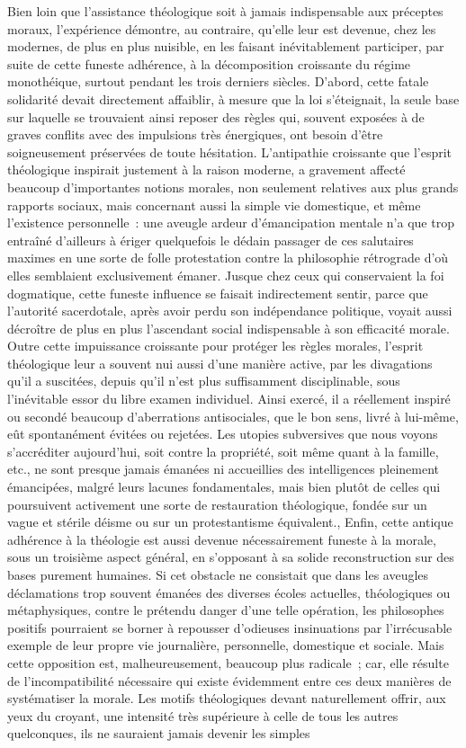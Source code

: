 \documentclass[french,twoside]{book} %
\begin{document}
Bien loin que l’assistance théologique soit à jamais indispensable aux préceptes moraux, l’expérience démontre, au contraire, qu’elle leur est devenue, chez les modernes, de plus en plus nuisible, en les faisant inévitablement participer, par suite de cette funeste adhérence, à la décomposition croissante du régime monothéique, surtout pendant les trois derniers siècles. D’abord, cette fatale solidarité devait directement affaiblir, à mesure que la loi s’éteignait, la seule base sur laquelle se trouvaient ainsi reposer des règles qui, souvent exposées à de graves conflits avec des impulsions très énergiques, ont besoin d’être soigneusement préservées de toute hésitation. L’antipathie croissante que l’esprit théologique inspirait justement à la raison moderne, a gravement affecté beaucoup d’importantes notions morales, non seulement relatives aux plus grands rapports sociaux, mais concernant aussi la simple vie domestique, et même l’existence personnelle : une aveugle ardeur d’émancipation mentale n’a que trop entraîné d’ailleurs à ériger quelquefois le dédain passager de ces salutaires maximes en une sorte de folle protestation contre la philosophie rétrograde d’où elles semblaient exclusivement émaner. Jusque chez ceux qui conservaient la foi dogmatique, cette funeste influence se faisait indirectement sentir, parce que l’autorité sacerdotale, après avoir perdu son indépendance politique, voyait aussi décroître de plus en plus l’ascendant social indispensable à son efficacité morale. Outre cette impuissance croissante pour protéger les règles morales, l’esprit théologique leur a souvent nui aussi d’une manière active, par les divagations qu’il a suscitées, depuis qu’il n’est plus suffisamment disciplinable, sous l’inévitable essor du libre examen individuel. Ainsi exercé, il a réellement inspiré ou secondé beaucoup d’aberrations antisociales, que le bon sens, livré à lui-même, eût spontanément évitées ou rejetées. Les utopies subversives que nous voyons s’accréditer aujourd’hui, soit contre la propriété, soit même quant à la famille, etc., ne sont presque jamais émanées ni accueillies des intelligences pleinement émancipées, malgré leurs lacunes fondamentales, mais bien plutôt de celles qui poursuivent activement une sorte de restauration théologique, fondée sur un vague et stérile déisme ou sur un protestantisme équivalent., Enfin, cette antique adhérence à la théologie est aussi devenue nécessairement funeste à la morale, sous un troisième aspect général, en s’opposant à sa solide reconstruction sur des bases purement humaines. Si cet obstacle ne consistait que dans les aveugles déclamations trop souvent émanées des diverses écoles actuelles, théologiques ou métaphysiques, contre le prétendu danger d’une telle opération, les philosophes positifs pourraient se borner à repousser d’odieuses insinuations par l’irrécusable exemple de leur propre vie journalière, personnelle, domestique et sociale. Mais cette opposition est, malheureusement, beaucoup plus radicale ; car, elle résulte de l’incompatibilité nécessaire qui existe évidemment entre ces deux manières de systématiser la morale. Les motifs théologiques devant naturellement offrir, aux yeux du croyant, une intensité très supérieure à celle de tous les autres quelconques, ils ne sauraient jamais devenir les simples 
\end{document}
